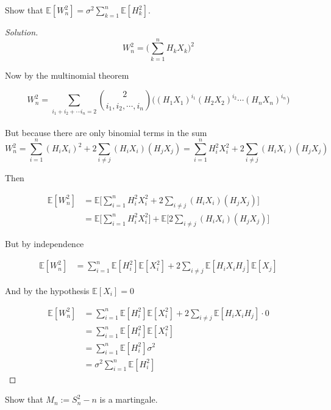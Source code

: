 \documentclass[12pt]{article}
\newenvironment{problem}[2][Problem]{\begin{trivlist}
\item[\hskip \labelsep {\bfseries #1}\hskip \labelsep {\bfseries #2.}]}{\end{trivlist}}
\newenvironment{solution}
  {\begin{proof}[Solution]\renewcommand{\qedsymbol}{}}
  {\end{proof}}
\begin{document}
\begin{problem}{5(b)}

Show that $\mathbb{E}[W_n^2] = \sigma^2\sum_{k=1}^n\mathbb{E}[H_k^2]$.

\end{problem}
\begin{solution}\ \\

$$
W_n^2 = \bigg(\sum_{k=1}^nH_k X_k\bigg)^2 
$$

Now by the multinomial theorem 

$$
W_n^2 = \sum_{i_1+i_2+ \cdots i_n = 2} {2 \choose i_1,i_2, \cdots, i_n} \bigg((H_1 X_1)^{i_1}(H_2 X_2)^{i_2} \cdots (H_n X_n)^{i_n}\bigg) 
$$
\\
But because there are only binomial terms in the sum
$$
W_n^2 =  \sum_{i=1}^n(H_i X_i)^2 + 2\sum_{i \neq j}(H_i X_i)(H_j X_j) = \sum_{i=1}^nH_i^2 X_i^2 + 2\sum_{i \neq j}(H_i X_i)(H_j X_j)
$$

Then

\begin{align*}
\mathbb{E}[W_n^2] &= \mathbb{E}\bigg[ \sum_{i=1}^nH_i^2 X_i^2 + 2\sum_{i \neq j}(H_i X_i)(H_j X_j)  \bigg] \\
&= \mathbb{E}\bigg[\sum_{i=1}^nH_i^2 X_i^2\bigg]+\mathbb{E}\bigg[ 2\sum_{i \neq j}(H_i X_i)(H_j X_j)\bigg]
\end{align*}

But by independence

\begin{align*}
\mathbb{E}[W_n^2] &= \sum_{i=1}^n \mathbb{E}[H_i^2] \mathbb{E}[X_i^2] + 2\sum_{i \neq j}\mathbb{E}[H_i X_iH_j]\mathbb{E}[ X_j]
\end{align*}

And by the hypothesis $\mathbb{E}[X_i] = 0$

\begin{align*}
\mathbb{E}[W_n^2] &= \sum_{i=1}^n \mathbb{E}[H_i^2] \mathbb{E}[X_i^2] + 2\sum_{i \neq j}\mathbb{E}[H_i X_iH_j]\cdot 0 \\
&=\sum_{i=1}^n \mathbb{E}[H_i^2] \mathbb{E}[X_i^2] \\
&=\sum_{i=1}^n \mathbb{E}[H_i^2] \sigma^2 \\
&= \sigma^2 \sum_{i=1}^n \mathbb{E}[H_i^2]
\end{align*}

\end{solution}

\begin{problem}{6(a)}

Show that $M_n := S_n^2 -n $ is a martingale.

\end{problem}
\end{document}

